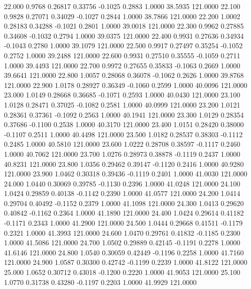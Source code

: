   22.000   0.9768   0.26817   0.33756  -0.1025   0.2883   1.0000  38.5935 121.0000
  22.100   0.9828   0.27071   0.34029  -0.1027   0.2844   1.0000  38.7866 121.0000
  22.200   1.0002   0.28183   0.34288  -0.1021   0.2801   1.0000  39.0018 121.0000
  22.300   0.9962   0.27885   0.34608  -0.1032   0.2794   1.0000  39.0375 121.0000
  22.400   0.9931   0.27636   0.34934  -0.1043   0.2780   1.0000  39.1079 121.0000
  22.500   0.9917   0.27497   0.35254  -0.1052   0.2752   1.0000  39.2488 121.0000
  22.600   0.9931   0.27510   0.35555  -0.1059   0.2711   1.0000  39.4493 121.0000
  22.700   0.9972   0.27655   0.35833  -0.1063   0.2669   1.0000  39.6641 121.0000
  22.800   1.0057   0.28068   0.36078  -0.1062   0.2626   1.0000  39.8768 121.0000
  22.900   1.0178   0.28927   0.36349  -0.1060   0.2599   1.0000  40.0096 121.0000
  23.000   1.0149   0.28668   0.36685  -0.1071   0.2593   1.0000  40.0430 121.0000
  23.100   1.0128   0.28471   0.37025  -0.1082   0.2581   1.0000  40.0999 121.0000
  23.200   1.0121   0.28361   0.37361  -0.1092   0.2563   1.0000  40.1941 121.0000
  23.300   1.0129   0.28354   0.37686  -0.1100   0.2538   1.0000  40.3170 121.0000
  23.400   1.0151   0.28420   0.38000  -0.1107   0.2511   1.0000  40.4498 121.0000
  23.500   1.0182   0.28537   0.38303  -0.1112   0.2485   1.0000  40.5810 121.0000
  23.600   1.0222   0.28708   0.38597  -0.1117   0.2460   1.0000  40.7062 121.0000
  23.700   1.0276   0.28973   0.38878  -0.1119   0.2437   1.0000  40.8231 121.0000
  23.800   1.0356   0.29462   0.39147  -0.1120   0.2416   1.0000  40.9280 121.0000
  23.900   1.0462   0.30318   0.39436  -0.1119   0.2401   1.0000  41.0030 121.0000
  24.000   1.0440   0.30069   0.39785  -0.1130   0.2396   1.0000  41.0248 121.0000
  24.100   1.0424   0.29859   0.40138  -0.1142   0.2390   1.0000  41.0577 121.0000
  24.200   1.0414   0.29704   0.40492  -0.1152   0.2379   1.0000  41.1098 121.0000
  24.300   1.0413   0.29620   0.40842  -0.1162   0.2364   1.0000  41.1890 121.0000
  24.400   1.0424   0.29614   0.41182  -0.1171   0.2343   1.0000  41.2900 121.0000
  24.500   1.0444   0.29668   0.41511  -0.1179   0.2321   1.0000  41.3993 121.0000
  24.600   1.0470   0.29761   0.41832  -0.1185   0.2300   1.0000  41.5086 121.0000
  24.700   1.0502   0.29889   0.42145  -0.1191   0.2278   1.0000  41.6146 121.0000
  24.800   1.0540   0.30059   0.42449  -0.1196   0.2258   1.0000  41.7160 121.0000
  24.900   1.0587   0.30300   0.42742  -0.1199   0.2239   1.0000  41.8122 121.0000
  25.000   1.0652   0.30712   0.43018  -0.1200   0.2220   1.0000  41.9053 121.0000
  25.100   1.0770   0.31738   0.43280  -0.1197   0.2203   1.0000  41.9929 121.0000
